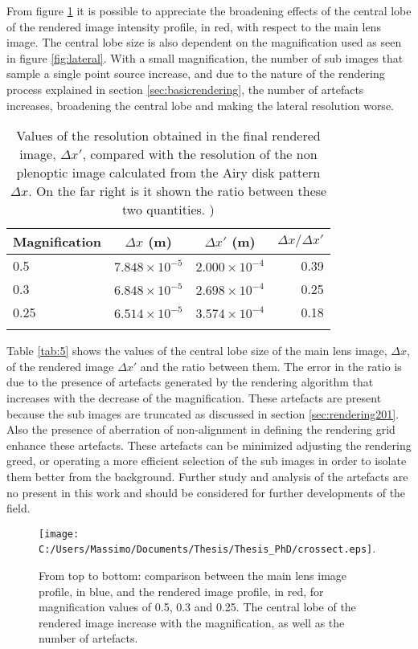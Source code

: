 From figure \ref{fig:prof05} it is possible to appreciate the broadening effects of the central lobe of the rendered image intensity profile, in red, with respect to the main lens image. The central lobe size is also dependent on the magnification used as seen in figure \ref{fig:lateral}. With a small magnification, the number of sub images that sample a single point source increase, and due to the nature of the rendering process explained in section \ref{sec:basicrendering}, the number of artefacts increases, broadening the central lobe and making the lateral resolution worse.
\begin{table}
\centering
\begin{tabular}{l|c|c|r}
Magnification & $\Delta x$ (m)& $\Delta x'$ (m) & $\Delta x/\Delta x'$\\ \hline
0.5 & $7.848 \times 10^{-5}$ &  $2.000 \times 10^{-4}$ & 0.39\\ \hline
0.3 & $6.848 \times 10^{-5}$ &  $2.698 \times 10^{-4}$ & 0.25 \\ \hline
0.25 & $6.514\times 10^{-5}$ &  $3.574 \times 10^{-4}$ & 0.18 \\ 
\label{tab:5}
\end{tabular}
\caption{\label{tab:magnification}Values of the resolution obtained in the final rendered image, $\Delta x'$, compared with the resolution of the non plenoptic image calculated from the Airy disk pattern $\Delta x$. On the far right is it shown the ratio between these two quantities. )}
\end{table} 
Table \ref{tab:5} shows the values of the central lobe size of the main lens image, $\Delta x$, of the rendered image $\Delta x'$ and the ratio between them. The error in the ratio is due to the presence of artefacts generated by the rendering algorithm that increases with the decrease of the magnification. These artefacts are present because the sub images are truncated as discussed in section \ref{sec:rendering201}. Also the presence of aberration of non-alignment in defining the rendering grid enhance these artefacts. These artefacts can be minimized adjusting the rendering greed, or operating a more efficient selection of the sub images in order to isolate them better from the background. Further study and analysis of the artefacts are no present in this work and should be considered for further developments of the field. 
\begin{figure}[H]
	\centering
	\texttt{[image: C:/Users/Massimo/Documents/Thesis/Thesis\_PhD/crossect.eps]}.
	\caption{\label{fig:prof05} From top to bottom: comparison between the main lens image profile, in blue, and the rendered image profile, in red, for magnification values of 0.5, 0.3 and 0.25. The central lobe of the rendered image increase with the magnification, as well as the number of artefacts. }
\end{figure}
